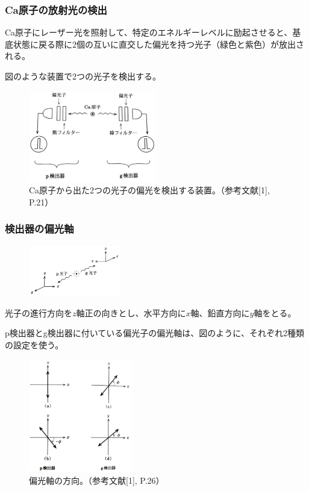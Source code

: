 \documentclass[10pt,b5paper,papersize,dvipdfmx]{jsbook}
\begin{document}
%
\subsubsection{Ca原子の放射光の検出} %

Ca原子にレーザー光を照射して、特定のエネルギーレベルに励起させると、基底状態に戻る際に2個の互いに直交した偏光を持つ光子（緑色と紫色）が放出される。

図のような装置で2つの光子を検出する。

\begin{figure}[ht]
  \centering
  \includegraphics[height=40mm]{nkym/fig/souchi.jpeg}
  \caption{Ca原子から出た2つの光子の偏光を検出する装置。（参考文献[1], P.21）}
\end{figure}

%
\subsubsection{検出器の偏光軸} %

\begin{figure}[ht]
  \centering
  \includegraphics[width=40mm]{nkym/fig/zahyou-kei.jpeg}
\end{figure}

光子の進行方向を$z$軸正の向きとし、水平方向に$x$軸、鉛直方向に$y$軸をとる。

p検出器とg検出器に付いている偏光子の偏光軸は、図のように、それぞれ2種類の設定を使う。

\begin{figure}[ht]
  \centering
  \includegraphics[width=45mm]{nkym/fig/henkou-jiku.jpeg}
  \caption{偏光軸の方向。（参考文献[1], P.26）}
\end{figure}
\end{document}

